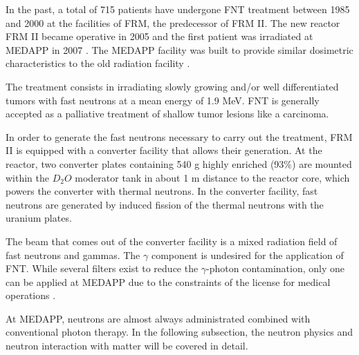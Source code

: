 In the past, a total of 715 patients have undergone FNT treatment between 1985 and 2000 at the facilities of FRM, the predecessor of FRM II. The new reactor FRM II became operative in 2005 and the first patient was irradiated at MEDAPP in 2007 \cite{Heinz}. The MEDAPP facility was built to provide similar dosimetric characteristics to the old radiation facility \cite{wagner2015FNTstatus}.

The treatment consists in irradiating slowly growing and/or well differentiated tumors \cite{wagner2008MEDAPP} with fast neutrons at a mean energy of 1.9 \unit{\mega\eV}. FNT is generally accepted as a palliative treatment of shallow tumor lesions \cite{wagner2008MEDAPP} like a carcinoma. 

In order to generate the fast neutrons necessary to carry out the treatment, FRM II is equipped with a converter facility that allows their generation. At the reactor, two converter plates containing 540 \unit{\gram} highly enriched  (93\%) \cite{wagner2015FNTstatus} are mounted within the $D_2O$ moderator tank in about 1 \unit{\meter} distance to the reactor core, which powers the converter with thermal neutrons. In the converter facility, fast neutrons are generated by induced fission of the thermal neutrons with the uranium plates. 

The beam that comes out of the converter facility is a mixed radiation field of fast neutrons and gammas. The $\gamma$ component is undesired for the application of FNT. While several filters exist to reduce the $\gamma$-photon contamination, only one can be applied at MEDAPP due to the constraints of the license for medical operations \cite{wagner2008MEDAPP}.

At MEDAPP, neutrons are almost always administrated combined with conventional photon therapy. 
In the following subsection, the neutron physics and neutron interaction with matter will be covered in detail.
